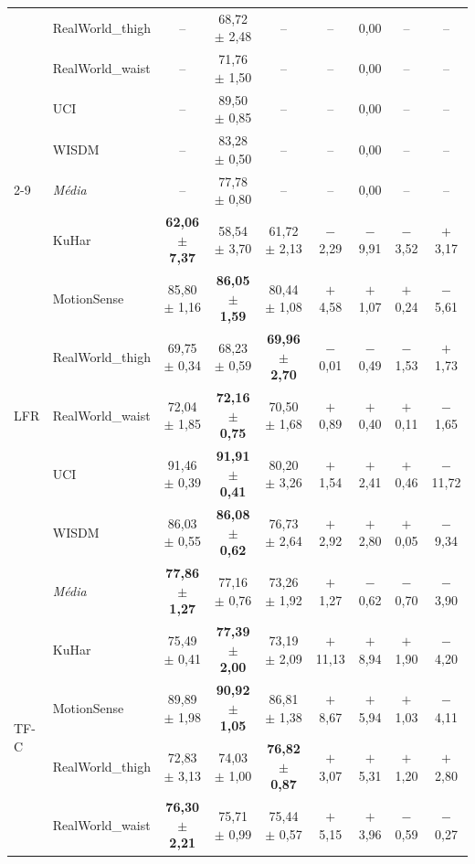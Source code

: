 \documentclass[border=8pt,varwidth=\maxdimen]{standalone}
\begin{document}
\begin{tabular}{llccccccc}
 & RealWorld\_thigh& -- & 68{,}72 $\pm$ 2{,}48 & -- & -- & 0{,}00 & -- & --\\
 & RealWorld\_waist& -- & 71{,}76 $\pm$ 1{,}50 & -- & -- & 0{,}00 & -- & --\\
 & UCI             & -- & 89{,}50 $\pm$ 0{,}85 & -- & -- & 0{,}00 & -- & --\\
 & WISDM           & -- & 83{,}28 $\pm$ 0{,}50 & -- & -- & 0{,}00 & -- & --\\
\cmidrule(lr){2-9}
 & \textit{Média}    & -- & 77{,}78 $\pm$ 0{,}80 & -- & -- & 0{,}00 & -- & --\\
\midrule
\multirow{7}{*}{LFR}
 & KuHar           & \textbf{62{,}06 $\pm$ 7{,}37} & 58{,}54 $\pm$ 3{,}70 & 61{,}72 $\pm$ 2{,}13 & $-$2{,}29 & $-$9{,}91 & $-$3{,}52 & $+$3{,}17\\
 & MotionSense     & 85{,}80 $\pm$ 1{,}16 & \textbf{86{,}05 $\pm$ 1{,}59} & 80{,}44 $\pm$ 1{,}08 & $+$4{,}58 & $+$1{,}07 & $+$0{,}24 & $-$5{,}61\\
 & RealWorld\_thigh& 69{,}75 $\pm$ 0{,}34 & 68{,}23 $\pm$ 0{,}59 & \textbf{69{,}96 $\pm$ 2{,}70} & $-$0{,}01 & $-$0{,}49 & $-$1{,}53 & $+$1{,}73\\
 & RealWorld\_waist& 72{,}04 $\pm$ 1{,}85 & \textbf{72{,}16 $\pm$ 0{,}75} & 70{,}50 $\pm$ 1{,}68 & $+$0{,}89 & $+$0{,}40 & $+$0{,}11 & $-$1{,}65\\
 & UCI             & 91{,}46 $\pm$ 0{,}39 & \textbf{91{,}91 $\pm$ 0{,}41} & 80{,}20 $\pm$ 3{,}26 & $+$1{,}54 & $+$2{,}41 & $+$0{,}46 & $-$11{,}72\\
 & WISDM           & 86{,}03 $\pm$ 0{,}55 & \textbf{86{,}08 $\pm$ 0{,}62} & 76{,}73 $\pm$ 2{,}64 & $+$2{,}92 & $+$2{,}80 & $+$0{,}05 & $-$9{,}34\\
\cmidrule(lr){2-9}
 & \textit{Média}    & \textbf{77{,}86 $\pm$ 1{,}27} & 77{,}16 $\pm$ 0{,}76 & 73{,}26 $\pm$ 1{,}92 & $+$1{,}27 & $-$0{,}62 & $-$0{,}70 & $-$3{,}90\\
\midrule
\multirow{7}{*}{TF-C}
 & KuHar           & 75{,}49 $\pm$ 0{,}41 & \textbf{77{,}39 $\pm$ 2{,}00} & 73{,}19 $\pm$ 2{,}09 & $+$11{,}13 & $+$8{,}94 & $+$1{,}90 & $-$4{,}20\\
 & MotionSense     & 89{,}89 $\pm$ 1{,}98 & \textbf{90{,}92 $\pm$ 1{,}05} & 86{,}81 $\pm$ 1{,}38 & $+$8{,}67 & $+$5{,}94 & $+$1{,}03 & $-$4{,}11\\
 & RealWorld\_thigh& 72{,}83 $\pm$ 3{,}13 & 74{,}03 $\pm$ 1{,}00 & \textbf{76{,}82 $\pm$ 0{,}87} & $+$3{,}07 & $+$5{,}31 & $+$1{,}20 & $+$2{,}80\\
 & RealWorld\_waist& \textbf{76{,}30 $\pm$ 2{,}21} & 75{,}71 $\pm$ 0{,}99 & 75{,}44 $\pm$ 0{,}57 & $+$5{,}15 & $+$3{,}96 & $-$0{,}59 & $-$0{,}27\\

\end{tabular}
\end{document}
